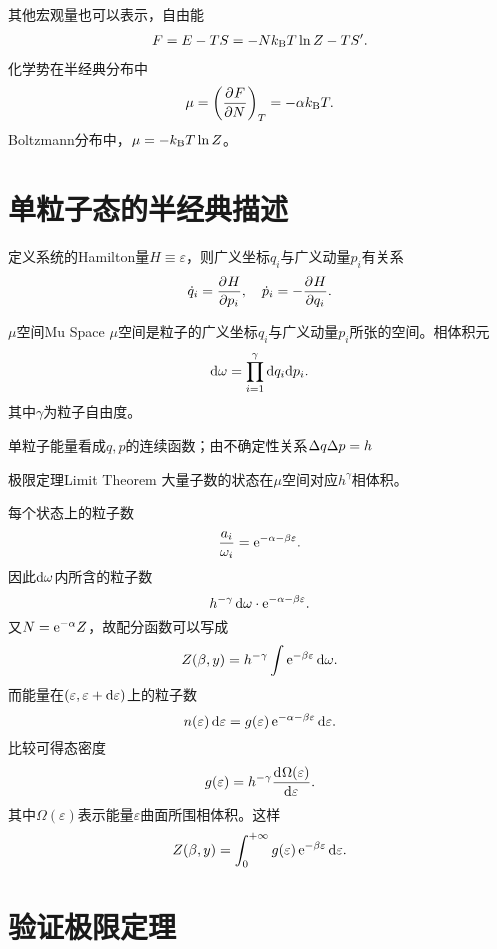 其他宏观量也可以表示，自由能
\begin{align}
	F=E-TS=-Nk_{\mathrm B} T\ln Z-TS'.
\end{align}
化学势在半经典分布中
\[
	\mu=\left(\frac{\partial^{{}}F}{\partial{N}^{{}}}\right)_T=-\alpha k_{\mathrm B} T.
\]
Boltzmann分布中，$\mu=-k_{\mathrm B} T\ln Z$。

\section{单粒子态的半经典描述}

定义系统的Hamilton量$H\equiv\varepsilon$，则广义坐标$q_i$与广义动量$p_i$有关系
\[
	\dot q_i=\frac{\partial^{{}}H}{\partial{p_i}^{{}}},\quad\dot p_i=-\frac{\partial^{{}}H}{\partial{q_i}^{{}}}.
\]
\begin{definition}{$\mu$空间}{Mu Space}
	$\mu$空间是粒子的广义坐标$q_i$与广义动量$p_i$所张的空间。相体积元
	\begin{align}
		\mathop{}\!\mathrm{d}\omega=\prod_{i=1}^\gamma\mathop{}\!\mathrm{d} q_i\mathrm{d} p_i.
	\end{align}
	其中$\gamma$为粒子自由度。
\end{definition}
单粒子能量看成$q,p$的连续函数；由不确定性关系$\Delta q\Delta p=h$
\begin{theorem}{极限定理}{Limit Theorem}
	大量子数的状态在$\mu$空间对应$h^\gamma$相体积。
\end{theorem}
每个状态上的粒子数
\begin{align}
	\frac{a_i}{\omega_i}=\mathop{}\!\mathrm{e}^{-\alpha-\beta\varepsilon}.
\end{align}
因此$\mathop{}\!\mathrm{d}\omega$内所含的粒子数
\[
	h^{-\gamma}\mathop{}\!\mathrm{d}\omega\cdot\mathop{}\!\mathrm{e}^{-\alpha-\beta\varepsilon}.
\]
又$N=\mathop{}\!\mathrm{e}^{-\alpha}Z$，故配分函数可以写成
\begin{align}
	Z(\beta,y)=h^{-\gamma}\int\mathop{}\!\mathrm{e}^{-\beta\varepsilon}\mathop{}\!\mathrm{d}\omega.
\end{align}
而能量在$\left(\varepsilon,\varepsilon+\mathop{}\!\mathrm{d}\varepsilon\right)$上的粒子数
\[
	n(\varepsilon)\mathop{}\!\mathrm{d}\varepsilon=g(\varepsilon)\mathop{}\!\mathrm{e}^{-\alpha-\beta\varepsilon}\mathop{}\!\mathrm{d}\varepsilon.
\]
比较可得态密度
\[
	g(\varepsilon)=h^{-\gamma}\frac{\mathrm{d}^{{}}\Omega(\varepsilon)}{\mathrm{d}{\varepsilon}^{{}}}.
\]
其中$\Omega(\varepsilon)$表示能量$\varepsilon$曲面所围相体积。这样
\begin{align}
	Z(\beta,y)=\int_0^{+\infty} g(\varepsilon)\mathop{}\!\mathrm{e}^{-\beta\varepsilon}\mathop{}\!\mathrm{d}\varepsilon.
\end{align}

\section*{验证极限定理}

